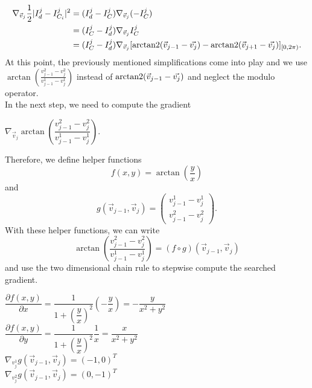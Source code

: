 \begin{proposition}
	\begin{align*}
		\nabla_{\vec{v}_j} \frac{1}{2}| I^{j}_d - I^{j}_{C_i} |^2 
		&= (I^{j}_d - I^j_{C}) \nabla_{\vec{v}_j} (- I^j_{C})\\
		&= (I^j_{C} - I^{j}_d) \nabla_{\vec{v}_j}  I^j_{C}   \\
		&= (I^j_{C} - I^{j}_d) \nabla_{\vec{v}_j} [\operatorname{arctan2}(\vec{v}_{j-1} - \vec{v_j}) - \operatorname{arctan2}(\vec{v}_{j+1} - \vec{v_j})]_{[0,2\pi)}.
	\end{align*}
	At this point, the previously mentioned simplifications come into play and we use $\arctan \left(\frac{v_{j-1}^2 - v_{j}^2}{v_{j-1}^1 - v_{j}^1} \right)$ instead of $\operatorname{arctan2}(\vec{v}_{j-1} - \vec{v_j})$ and neglect the modulo operator. \\
	In the next step, we need to compute the gradient 
	\begin{center}
		$
		\nabla_{\vec{v}_j} \arctan \left(\dfrac{v_{j-1}^2 - v_{j}^2}{v_{j-1}^1 - v_{j}^1} \right).
		$
	\end{center}
	
	Therefore, we define helper functions 
	$$ f(x,y) = \arctan \left( \frac{y}{x} \right)$$ 
	and 
	$$g(\vec{v}_{j-1}, \vec{v}_{j}) = \begin{pmatrix}
		v_{j-1}^1 - v_{j}^1 \\[0.5em] 
		v_{j-1}^2 - v_{j}^2
	\end{pmatrix}.$$
	With these helper functions, we can write 
	$$ \arctan\left(\frac{v_{j-1}^2 - v_{j}^2}{v_{j-1}^1 - v_{j}^1}\right) = (f \circ g) (\vec{v}_{j-1}, \vec{v}_{j}) $$
	and use the two dimensional chain rule to stepwise compute the searched gradient. 
 
	\begin{center}
		
		$\dfrac{\partial f(x,y)}{\partial x} = \dfrac{1}{1 + \left(\dfrac{y}{x}\right)^2} \left(- \dfrac{y}{x}\right) = - \dfrac{y}{x^2 + y^2}$ \\
		$\dfrac{\partial f(x,y)}{\partial y} = \dfrac{1}{1 + \left(\dfrac{y}{x}\right)^2}  \dfrac{1}{x} =  \dfrac{x}{x^2 + y^2}$ \\ [0.5em]

		$ \nabla_{v_j^1} g(\vec{v}_{j-1}, \vec{v}_{j}) = (-1, 0)^T$ \\
		$ \nabla_{v_j^2} g(\vec{v}_{j-1}, \vec{v}_{j}) = (0, -1)^T$ 
	
	\end{center}


\end{proposition}
